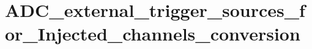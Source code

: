 \hypertarget{group___a_d_c__external__trigger__sources__for___injected__channels__conversion}{\section{A\-D\-C\-\_\-external\-\_\-trigger\-\_\-sources\-\_\-for\-\_\-\-Injected\-\_\-channels\-\_\-conversion}
\label{group___a_d_c__external__trigger__sources__for___injected__channels__conversion}
}
